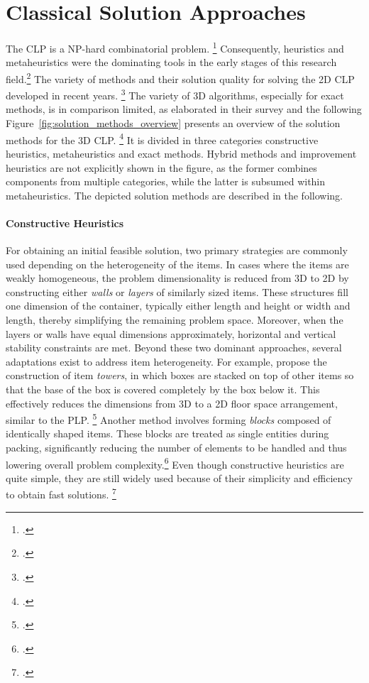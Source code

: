 \chapter{Classical Solution Approaches}
\label{sec:classical_solution_approaches}
The \gls{CLP} is a NP-hard combinatorial problem. \footcite[cf.][p. 11]{bortfeldt_constraints_2013}
Consequently, heuristics and metaheuristics were the dominating tools
in the early stages of this research field.\footcite[cf.][]{pisinger_heuristics_2002} The variety of methods
and their solution quality for solving the 2D \gls{CLP} developed in recent years. \footcite[cf.][p. 23]{iori_exact_2021}
The variety of 3D algorithms, especially for exact methods, is in comparison limited, as
\citeauthor*{zhao_comparative_2016} elaborated in their survey and the following Figure~\ref{fig:solution_methods_overview}
presents an overview of the solution methods for the 3D \gls{CLP}. \footcite[cf.][]{zhao_comparative_2016}
It is divided in three categories constructive heuristics, metaheuristics
and exact methods. Hybrid methods and improvement heuristics are not explicitly shown in the figure,
as the former combines components from multiple categories, while the latter is subsumed within
metaheuristics. The depicted solution methods are described in the following.



\subsubsection{Constructive Heuristics}
For obtaining an initial feasible solution, two primary strategies are commonly
used depending on the heterogeneity of the items. In cases where the items are weakly homogeneous,
the problem dimensionality is reduced from 3D to 2D by constructing either
\textit{walls} or \textit{layers} of similarly sized items. These structures fill one
dimension of the container, typically either length and height or width and length, thereby
simplifying the remaining problem space. Moreover, when the layers or walls have
equal dimensions approximately, horizontal and vertical stability constraints are met.
Beyond these two dominant approaches, several adaptations exist to address item heterogeneity.
For example, \citeauthor*{gehring_genetic_1997} propose the construction of item
\textit{towers}, in which boxes are stacked on top of other items so that the base of the box is covered completely
by the box below it.
This effectively reduces the dimensions from 3D to a 2D floor space arrangement,
similar to the \gls{PLP}. \footcite[cf.][pp. 402--406]{gehring_genetic_1997}
Another method involves forming \textit{blocks} composed of identically shaped items.
These blocks are treated as single entities
during packing, significantly reducing the number of elements to be handled and thus
lowering overall problem complexity.\footcite[cf.][p. 801]{liu_novel_2011} Even though constructive heuristics are quite simple,
they are still widely used because of their simplicity and efficiency to obtain fast solutions.
\footcite[cf.][pp. 11--13]{tamke_branch-and-cut_2024}

